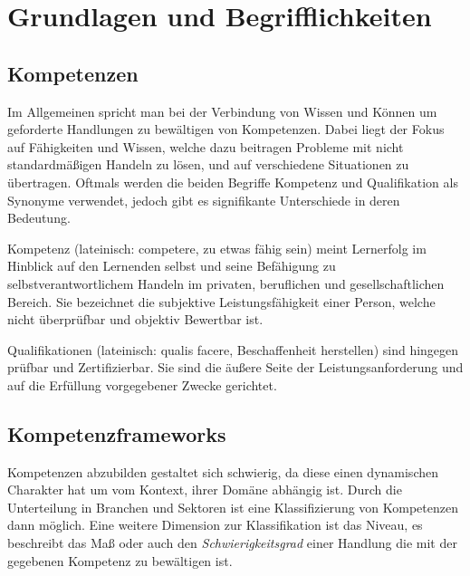 \section{Grundlagen und Begrifflichkeiten}\label{2_grundlagen}


\subsection{Kompetenzen}\label{competencies}

Im Allgemeinen spricht man bei der Verbindung von Wissen und Können um geforderte Handlungen zu bewältigen von Kompetenzen. Dabei liegt der Fokus auf Fähigkeiten und Wissen, welche dazu beitragen Probleme mit nicht standardmäßigen Handeln zu lösen, und auf verschiedene Situationen zu übertragen.\cite{bibb} Oftmals werden die beiden Begriffe Kompetenz und Qualifikation als Synonyme verwendet, jedoch gibt es signifikante Unterschiede in deren Bedeutung.
\vspace{1em}

Kompetenz (lateinisch: competere, zu etwas fähig sein) meint Lernerfolg im Hinblick auf den Lernenden selbst und seine Befähigung zu selbstverantwortlichem Handeln im privaten, beruflichen und gesellschaftlichen Bereich. Sie bezeichnet die subjektive Leistungsfähigkeit einer Person, welche nicht überprüfbar und objektiv Bewertbar ist.\cite{Bauer2015}\newline

Qualifikationen (lateinisch: qualis facere, Beschaffenheit herstellen) sind hingegen prüfbar und Zertifizierbar. Sie sind die äußere Seite der Leistungsanforderung und auf die Erfüllung vorgegebener Zwecke gerichtet. \cite{Bauer2015}


\subsection{Kompetenzframeworks}

Kompetenzen abzubilden gestaltet sich schwierig, da diese einen dynamischen Charakter hat um vom Kontext, ihrer Domäne abhängig ist. Durch die Unterteilung in Branchen und Sektoren ist eine Klassifizierung von Kompetenzen dann möglich. Eine weitere Dimension zur Klassifikation ist das Niveau, es beschreibt das Maß oder auch den \emph{Schwierigkeitsgrad} einer Handlung die mit der gegebenen Kompetenz zu bewältigen ist. 
\vspace{1em}

